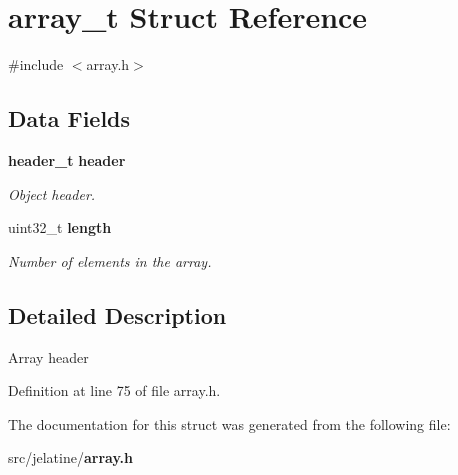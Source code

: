 \section{array\_\-t Struct Reference}
\label{structarray__t}


{\ttfamily \#include $<$array.h$>$}

\subsection*{Data Fields}
\begin{DoxyCompactItemize}
\item 
{\bf header\_\-t} {\bf header}\label{structarray__t_a0b04b1eae80aefdae0200ac7083a8695}

\begin{DoxyCompactList}\small\item\em Object header. \item\end{DoxyCompactList}\item 
uint32\_\-t {\bf length}\label{structarray__t_acc4c0bab2a83d5b134891f445d37a5bf}

\begin{DoxyCompactList}\small\item\em Number of elements in the array. \item\end{DoxyCompactList}\end{DoxyCompactItemize}


\subsection{Detailed Description}
Array header 

Definition at line 75 of file array.h.



The documentation for this struct was generated from the following file:\begin{DoxyCompactItemize}
\item 
src/jelatine/{\bf array.h}\end{DoxyCompactItemize}

